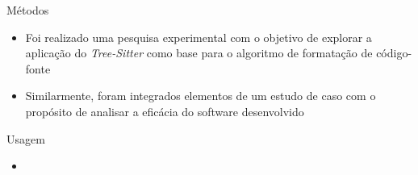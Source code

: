 \documentclass
  [ aspectratio=169,
    english,
    hyperref={citecolor=blue,colorlinks=true,linkcolor=blue,urlcolor=blue},
    brazil]
  {beamer}
\newcommand{\treesitter}{\textit{Tree-Sitter}\xspace}
\begin{document}

  \begin{frame}{Métodos}
    \begin{itemize}
      \item Foi realizado uma pesquisa experimental com o objetivo de explorar
            a aplicação do \treesitter como base para o algoritmo de formatação
            de código-fonte
      \item Similarmente, foram integrados elementos de um estudo de caso com o
            propósito de analisar a eficácia do software desenvolvido
    \end{itemize}
  \end{frame}


  \begin{frame}[fragile]{Usagem}
    \begin{itemize}
      \item {}
    \end{itemize}
  \end{frame}

\end{document}

